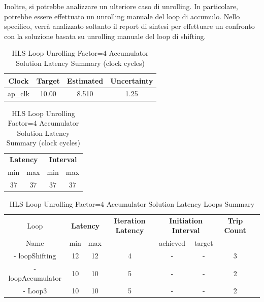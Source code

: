 Inoltre, si potrebbe analizzare un ulteriore caso di unrolling. In particolare, potrebbe essere effettuato un unrolling manuale del loop di accumulo. Nello specifico, verrà analizzato soltanto il report di sintesi per effettuare un confronto con la soluzione basata su unrolling manuale del loop di shifting.



\begin{table}[H]
	\centering
	\begin{minipage}[t]{0.45\linewidth}
		\centering
		\begin{tabular}{|c|c|c|c|}
			\hline
			\textbf{Clock} & \textbf{Target} & \textbf{Estimated} & \textbf{Uncertainty} \\
			\hline
			ap\_clk & 10.00 & 8.510 & 1.25 \\
			\hline
		\end{tabular}
		\caption{HLS Loop Unrolling Factor=4 Accumulator Solution Timing Summary (ns)}
		\label{tab:hls-loop-unrolling4-accumulator-solution-timing-summary}
	\end{minipage}
	\hfill
	\begin{minipage}[t]{0.45\linewidth}
		\centering
		\begin{tabular}{|c|c|c|c|}
			\hline
			\multicolumn{2}{|c|}{\textbf{Latency}} & \multicolumn{2}{|c|}{\textbf{Interval}} \\
			min & max & min & max \\
			\hline
			37 & 37 & 37 & 37 \\
			\hline
		\end{tabular}
		\caption{HLS Loop Unrolling Factor=4 Accumulator Solution Latency Summary (clock cycles)}
		\label{tab:hls-loop-unrolling4-accumulator-solution-latency-summary}
	\end{minipage}
\end{table}

\begin{table}[H]
	\centering
	\begin{tabular}{|c|c|c|c|c|c|c|c|}
		\hline
		\multicolumn{1}{|c|}{Loop} & \multicolumn{2}{|c|}{\textbf{Latency}} & \multicolumn{1}{c|}{\textbf{Iteration Latency}} & \multicolumn{2}{c|}{\textbf{Initiation Interval}} & \multicolumn{1}{c|}{\textbf{Trip Count}}  \\
		Name & min & max & & achieved & target &  \\
		\hline
		- loopShifting & 12 & 12 & 4 & - & - & 3 \\
		- loopAccumulator & 10 & 10 & 5 & - & - & 2 \\
		- Loop3 & 10 & 10 & 5 & - & - & 2 \\
		\hline
	\end{tabular}
	\caption{HLS Loop Unrolling Factor=4 Accumulator Solution Latency Loops Summary }
	\label{tab:hls-loop-unrolling4-accumulator-solution-loop-summary}
\end{table}

